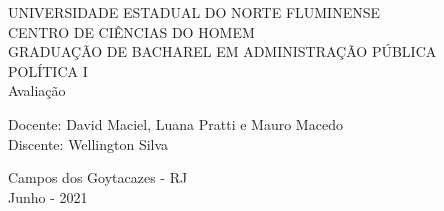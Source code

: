\begin{center}
    {\large UNIVERSIDADE ESTADUAL DO NORTE FLUMINENSE}
    \\[0.2cm]
    {\large CENTRO DE CIÊNCIAS DO HOMEM}
    \\[0.2cm]
    {\large GRADUAÇÃO DE BACHAREL EM ADMINISTRAÇÃO PÚBLICA}
    \\[0.2cm]
    {\large POLÍTICA I}
    \\[8cm]
    { \huge Avaliação}
    \\[6cm]
\end{center}

\begin{flushleft}
    Docente: David Maciel, Luana Pratti e Mauro Macedo \\[.2cm]
    Discente: Wellington Silva\\[4cm]
\end{flushleft}

\begin{center}
    {\large Campos dos Goytacazes - RJ}\\[0.2cm]
    {\large Junho - 2021}
\end{center}